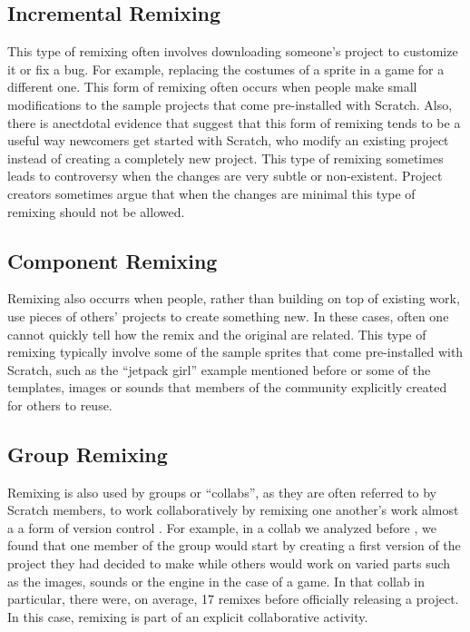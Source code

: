 \subsection{Incremental Remixing}
This type of remixing often involves downloading someone's project to customize it or fix a bug. 
For example, replacing the costumes of a sprite in a game for a different one. 
This form of remixing often occurs when people make small modifications to the sample projects that come pre-installed with Scratch.
Also, there is anectdotal evidence that suggest that this form of remixing tends to be a useful way newcomers get started with Scratch, who modify an existing project instead of creating a completely new project.
This type of remixing sometimes leads to controversy when the changes are very subtle or non-existent.
Project creators sometimes argue that when the changes are minimal this type of remixing should not be allowed.


\subsection{Component Remixing}
Remixing also occurrs when people, rather than building on top of existing work, use pieces of others' projects to create something new. 
In these cases, often one cannot quickly tell how the remix and the original are related.
This type of remixing typically involve some of the sample sprites that come pre-installed with Scratch, such as the ``jetpack girl'' example mentioned before or some of the templates, images or sounds that members of the community explicitly created for others to reuse.


\subsection{Group Remixing}
Remixing is also used by groups or ``collabs'', as they are often referred to by Scratch members, to work collaboratively by remixing one another's work almost a a form of version control \citep{tichy_rcs_1985}.
For example, in a collab we analyzed before \citep{aragon_tale_2009}, we found that one member of the group would start by creating a first version of the project they had decided to make while others would work on varied parts such as the images, sounds or the engine in the case of a game.
In that collab in particular, there were, on average, 17 remixes before officially releasing a project.
In this case, remixing is part of an explicit collaborative activity.


